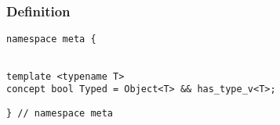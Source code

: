 
\subsubsection{Definition}

\begin{verbatim}
namespace meta {
\end{verbatim}
\begin{verbatim}

template <typename T>
concept bool Typed = Object<T> && has_type_v<T>;

\end{verbatim}
\begin{verbatim}
} // namespace meta
\end{verbatim}
